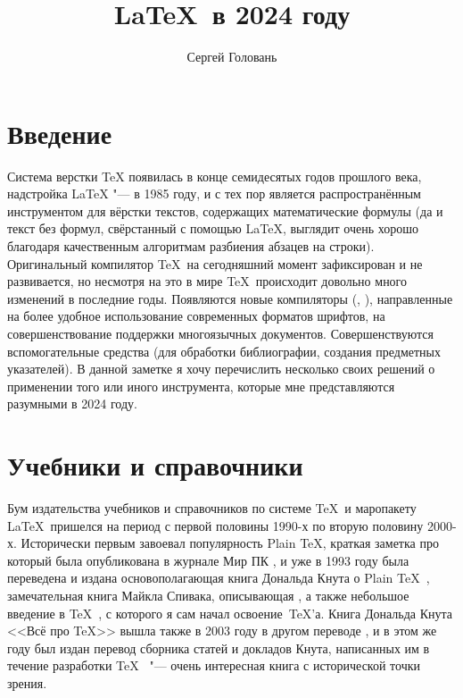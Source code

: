 \documentclass[a4paper,12pt,hyphens]{article}
\title{\LaTeX\ в 2024 году}
\author{Сергей Головань}
\begin{document}
%
\vspace{-\baselineskip}%
\maketitle
{}%
\vspace{-\baselineskip}%
\tableofcontents

\clearpage
\section{Введение}
Система верстки \TeX{} появилась в конце семидесятых годов прошлого века,
надстройка \LaTeX{} "--- в 1985 году, и с тех пор является распространённым
инструментом для вёрстки текстов, содержащих математические формулы (да и текст
без формул, свёрстанный с помощью \LaTeX, выглядит очень хорошо благодаря
качественным алгоритмам разбиения абзацев на строки). Оригинальный компилятор
\TeX\ на сегодняшний момент зафиксирован и не развивается, но несмотря на это
в мире \TeX\ происходит довольно много изменений в последние годы. Появляются
новые компиляторы (\XeTeX{}, \LuaTeX{}), направленные
на более удобное использование
современных форматов шрифтов, на совершенствование поддержки многоязычных
документов. Совершенствуются вспомогательные средства (для обработки
библиографии, создания предметных указателей). В данной заметке я хочу
перечислить несколько своих решений о применении того или иного инструмента,
которые мне представляются разумными в 2024 году.

\section{Учебники и справочники}
Бум издательства учебников и справочников по системе \TeX\ и маропакету \LaTeX\ пришелся
на период с первой половины 1990-х по вторую половину 2000-х. Исторически первым завоевал
популярность Plain \TeX, краткая заметка про который была опубликована в журнале Мир ПК \parencite{vinogradov:1992},
и уже в 1993 году была переведена и издана основополагающая книга Дональда Кнута о Plain \TeX\ \parencite{knuth:1993},
замечательная книга Майкла Спивака, описывающая  \parencite{spivak:1993}, а также
небольшое введение в \TeX\ \parencite{evgrafov-evgrafov:1993}, с которого я сам начал освоение~\TeX'а.
Книга Дональда Кнута <<Всё про \TeX>> вышла также в 2003 году в другом переводе \parencite{knuth:2003a}, и в этом же году
был издан перевод сборника статей и докладов Кнута, написанных им в течение разработки \TeX\ \parencite{knuth:2003b} "---
очень интересная книга с исторической точки зрения.
\end{document}
